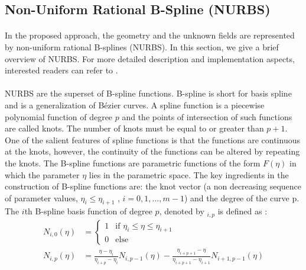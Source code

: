 \subsection{Non-Uniform Rational B-Spline (NURBS)}
\label{lr_sec:NURBS}
\paragraph{}
In the proposed approach, the geometry and the unknown fields are represented by non-uniform rational B-splines (NURBS).
In this section, we give a brief overview of NURBS.
For more detailed description and implementation aspects, interested readers can refer to \cite{Pie1997,NGUYEN201589}.
\paragraph{}
NURBS are the superset of B-spline functions.
B-spline is short for basis spline and is a generalization of Bézier curves.
A spline function is a piecewise polynomial function of degree $p$ and the points of intersection of such functions are called knots.
The number of knots must be equal to or greater than $p + 1$.
One of the salient features of spline functions is that the functions are continuous at the knots, however, the continuity of the functions can be altered by repeating the knots.
The B-spline functions are parametric functions of the form $F(\eta)$ in which the parameter $\eta$ lies in the parametric space.
The key ingredients in the construction of B-spline functions are: the knot vector (a non decreasing sequence of parameter values, $\eta_i \leq \eta_{i+1}$ , $i = 0,1,\dots,m -1$) and the degree of the curve p. The $i$th B-spline basis function of degree $p$, denoted by $_{i,p}$ is defined as \cite{Pie1997}:
\begin{equation}
    \begin{aligned}
        N_{i,0}(\eta) &=
            \begin{cases}
                1   & \text{if } \eta_i \leq \eta \leq \eta_{i+1}    \\
                0   & \text{else}
            \end{cases}\\
        N_{i,p}(\eta) &= 
            \frac{\eta - \eta_i}{\eta_{i+p}-\eta_i}     N_{i,p-1}(\eta) - 
            \frac{\eta_{i+p+1}-\eta}{\eta_{i+p+1} - \eta_{i+1}}     N_{i+1,p-1}(\eta)
    \end{aligned}
    \label{lr_nurbs_basis}
\end{equation}

